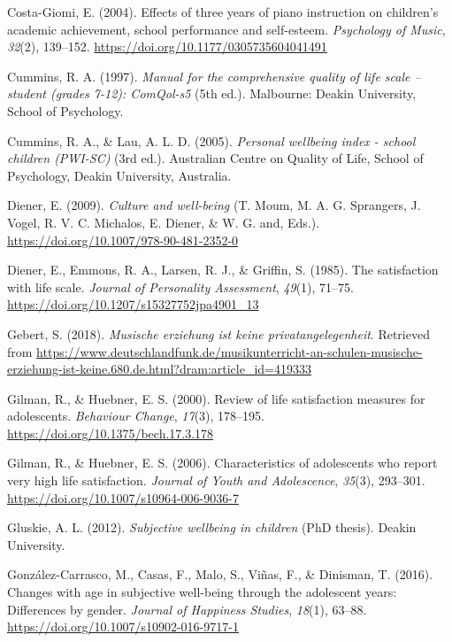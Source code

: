 \documentclass[a4, 12pt]{article}
\begin{document}
\leavevmode\hypertarget{ref-CostaGiomi2004}{}%
Costa-Giomi, E. (2004). Effects of three years of piano instruction on children's academic achievement, school performance and self-esteem. \emph{Psychology of Music}, \emph{32}(2), 139--152. \url{https://doi.org/10.1177/0305735604041491}

\leavevmode\hypertarget{ref-Cummins1997}{}%
Cummins, R. A. (1997). \emph{Manual for the comprehensive quality of life scale -- student (grades 7-12): ComQol-s5} (5th ed.). Malbourne: Deakin University, School of Psychology.

\leavevmode\hypertarget{ref-Cummins2005}{}%
Cummins, R. A., \& Lau, A. L. D. (2005). \emph{Personal wellbeing index - school children (PWI-SC)} (3rd ed.). Australian Centre on Quality of Life, School of Psychology, Deakin University, Australia.

\leavevmode\hypertarget{ref-Diener2009}{}%
Diener, E. (2009). \emph{Culture and well-being} (T. Moum, M. A. G. Sprangers, J. Vogel, R. V. C. Michalos, E. Diener, \& W. G. and, Eds.). \url{https://doi.org/10.1007/978-90-481-2352-0}

\leavevmode\hypertarget{ref-Diener1985}{}%
Diener, E., Emmons, R. A., Larsen, R. J., \& Griffin, S. (1985). The satisfaction with life scale. \emph{Journal of Personality Assessment}, \emph{49}(1), 71--75. \url{https://doi.org/10.1207/s15327752jpa4901_13}

\leavevmode\hypertarget{ref-Gebert2018}{}%
Gebert, S. (2018). \emph{Musische erziehung ist keine privatangelegenheit}. Retrieved from \url{https://www.deutschlandfunk.de/musikunterricht-an-schulen-musische-erziehung-ist-keine.680.de.html?dram:article_id=419333}

\leavevmode\hypertarget{ref-Gilman2000}{}%
Gilman, R., \& Huebner, E. S. (2000). Review of life satisfaction measures for adolescents. \emph{Behaviour Change}, \emph{17}(3), 178--195. \url{https://doi.org/10.1375/bech.17.3.178}

\leavevmode\hypertarget{ref-Gilman2006}{}%
Gilman, R., \& Huebner, E. S. (2006). Characteristics of adolescents who report very high life satisfaction. \emph{Journal of Youth and Adolescence}, \emph{35}(3), 293--301. \url{https://doi.org/10.1007/s10964-006-9036-7}

\leavevmode\hypertarget{ref-Gluskie2012}{}%
Gluskie, A. L. (2012). \emph{Subjective wellbeing in children} (PhD thesis). Deakin University.

\leavevmode\hypertarget{ref-GonzalezCarrasco2016}{}%
González-Carrasco, M., Casas, F., Malo, S., Viñas, F., \& Dinisman, T. (2016). Changes with age in subjective well-being through the adolescent years: Differences by gender. \emph{Journal of Happiness Studies}, \emph{18}(1), 63--88. \url{https://doi.org/10.1007/s10902-016-9717-1}
\end{document}
